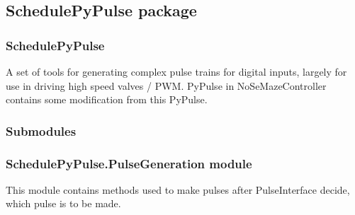 \documentclass[letterpaper,10pt,english]{sphinxmanual}
\begin{document}
\sphinxstepscope


\subsection{SchedulePyPulse package}
\label{\detokenize{NoSeMazeSchedule/SchedulePyPulse:schedulepypulse-package}}\label{\detokenize{NoSeMazeSchedule/SchedulePyPulse::doc}}

\subsubsection{SchedulePyPulse}
\label{\detokenize{NoSeMazeSchedule/SchedulePyPulse:schedulepypulse}}
\sphinxAtStartPar
A set of tools for generating complex pulse trains for digital inputs, largely for use in driving high speed valves / PWM. PyPulse in NoSeMazeController contains some modification from this PyPulse.


\subsubsection{Submodules}
\label{\detokenize{NoSeMazeSchedule/SchedulePyPulse:submodules}}

\subsubsection{SchedulePyPulse.PulseGeneration module}
\label{\detokenize{NoSeMazeSchedule/SchedulePyPulse:module-SchedulePyPulse.PulseGeneration}}\label{\detokenize{NoSeMazeSchedule/SchedulePyPulse:schedulepypulse-pulsegeneration-module}}
\sphinxAtStartPar
This module contains methods used to make pulses after PulseInterface decide,
which pulse is to be made.

\begin{fulllineitems}
\label{\detokenize{NoSeMazeSchedule/SchedulePyPulse:SchedulePyPulse.PulseGeneration.concatenated_pulse}}
\pysigstartsignatures
{}
\pysigstopsignatures
\end{fulllineitems}
\end{document}
